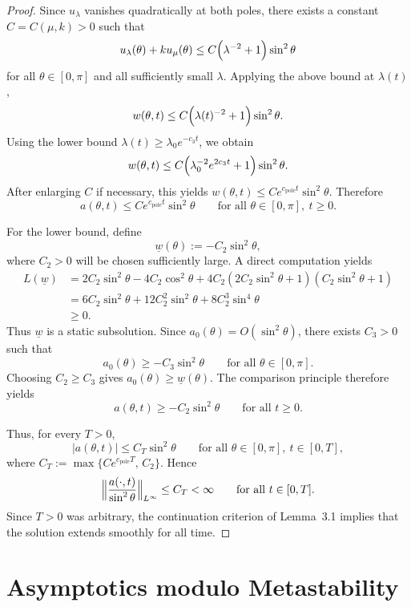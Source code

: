 \documentclass[11pt,a4paper]{article}
\numberwithin{equation}{section}
\theoremstyle{plain}
\theoremstyle{remark}
\begin{document}
\begin{proof}
Since $u_\lambda$ vanishes quadratically at both poles, there exists a constant
$C=C(\mu,k)>0$ such that
$$
u_\lambda(\theta)+ku_\mu(\theta)
\le
C\Bigl(\lambda^{-2}+1\Bigr)\sin^2\theta
$$
for all $\theta\in[0,\pi]$ and all sufficiently small $\lambda$. Applying the above bound at $\lambda(t)$,
$$
w(\theta,t)
\le
C\Bigl(\lambda(t)^{-2}+1\Bigr)\sin^2\theta.
$$
Using the lower bound $\lambda(t)\ge \lambda_0e^{-c_3t}$, we obtain
$$
w(\theta,t)
\le
C\Bigl(\lambda_0^{-2}e^{2c_3t}+1\Bigr)\sin^2\theta.
$$
After enlarging $C$ if necessary, this yields $w(\theta,t)
\le
Ce^{c_{\mathrm{pole}}t}\sin^2\theta$. Therefore
$$
a(\theta,t)
\le
Ce^{c_{\mathrm{pole}}t}\sin^2\theta
\qquad
\text{for all }\theta\in[0,\pi],\ t\ge0.
$$

For the lower bound, define
$$
\underline w(\theta):=-C_2\sin^2\theta,
$$
where $C_2>0$ will be chosen sufficiently large. A direct computation yields
\begin{align*}
L(\underline w)
&=
2C_2\sin^2\theta-4C_2\cos^2\theta
+
4C_2(2C_2\sin^2\theta+1)(C_2\sin^2\theta+1)\\
&=
6C_2\sin^2\theta
+
12C_2^2\sin^2\theta
+
8C_2^3\sin^4\theta\\
&\ge 0.
\end{align*}
Thus $\underline w$ is a static subsolution. Since $a_0(\theta)=O(\sin^2\theta)$, there exists $C_3>0$ such that
$$
a_0(\theta)\ge -C_3\sin^2\theta
\qquad\text{for all }\theta\in[0,\pi].
$$
Choosing $C_2\ge C_3$ gives $a_0(\theta)\ge\underline w(\theta)$. The comparison principle therefore yields
$$
a(\theta,t)\ge -C_2\sin^2\theta
\qquad\text{for all }t\ge0.
$$

Thus, for every $T>0$,
$$
|a(\theta,t)|
\le
C_T\sin^2\theta
\qquad
\text{for all }
\theta\in[0,\pi],\ t\in[0,T],
$$
where $C_T:=\max\{Ce^{c_{\mathrm{pole}}T},\,C_2\}$. Hence
$$
\Bigl\|
\frac{a(\cdot,t)}{\sin^2\theta}
\Bigr\|_{L^\infty}
\le C_T<\infty
\qquad
\text{for all }t\in[0,T].
$$
Since $T>0$ was arbitrary, the continuation criterion of Lemma~3.1
implies that the solution extends smoothly for all time.
\end{proof}

\section{Asymptotics modulo Metastability}
\end{document}
